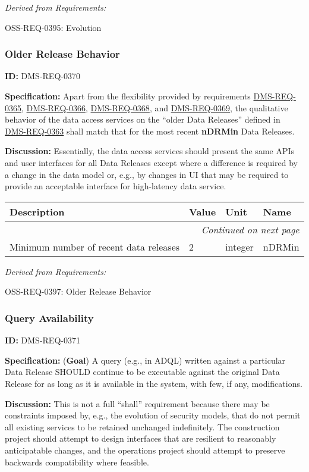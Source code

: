 \documentclass[SE,toc,lsstdraft]{lsstdoc}
\makeatletter
\newcommand{\paramname}[1]{\hspace{0pt}#1}
\newcommand{\unitname}[1]{\hspace{0pt}#1}
\newenvironment{parameters}[0]{%
\setlength\LTleft{0pt}
\setlength\LTright{\fill}
\begin{small}
\begin{longtable}[]{|p{0.49\textwidth}|l|p{0.6in}|p{1.70in}@{}|}

\hline \textbf{Description} & \textbf{Value} & \textbf{Unit} & \textbf{Name} \\ \hline
\endhead

\hline \multicolumn{4}{r}{\emph{Continued on next page}} \\
\endfoot

\hline\hline
\endlastfoot
}{%
\hline
\end{longtable}
\end{small}
}
\makeatother
\begin{document}
\emph{Derived from Requirements:}

OSS-REQ-0395:
Evolution \newline

\subsubsection{Older Release Behavior}

\label{DMS-REQ-0370}
\textbf{ID:} DMS-REQ-0370

\textbf{Specification:}
Apart from the flexibility provided by requirements \hyperref[DMS-REQ-0365]{DMS-REQ-0365}, \hyperref[DMS-REQ-0366]{DMS-REQ-0366}, \hyperref[DMS-REQ-0368]{DMS-REQ-0368}, and \hyperref[DMS-REQ-0369]{DMS-REQ-0369}, the qualitative behavior of the data access services on the “older Data Releases” defined in \hyperref[DMS-REQ-0363]{DMS-REQ-0363} shall match that for the most recent \textbf{nDRMin} Data Releases.

\textbf{Discussion:}
Essentially, the data access services should present the same APIs and user interfaces for all Data Releases except where a difference is required by a change in the data model or, e.g., by changes in UI that may be required to provide an acceptable interface for high-latency data service.

\begin{parameters}
Minimum number of recent data releases
&
2
&
\unitname{%
integer
}
&
\paramname{%
nDRMin
} \\\hline
\end{parameters}

\emph{Derived from Requirements:}

OSS-REQ-0397:
Older Release Behavior \newline

\subsubsection{Query Availability}

\label{DMS-REQ-0371}
\textbf{ID:} DMS-REQ-0371

\textbf{Specification:}
(\textbf{Goal}) A query (e.g., in ADQL) written against a particular Data Release SHOULD continue to be executable against the original Data Release for as long as it is available in the system, with few, if any, modifications.

\textbf{Discussion:}
This is not a full “shall” requirement because there may be constraints imposed by, e.g., the evolution of security models, that do not permit all existing services to be retained unchanged indefinitely. The construction project should attempt to design interfaces that are resilient to reasonably anticipatable changes, and the operations project should attempt to preserve backwards compatibility where feasible.
\end{document}
